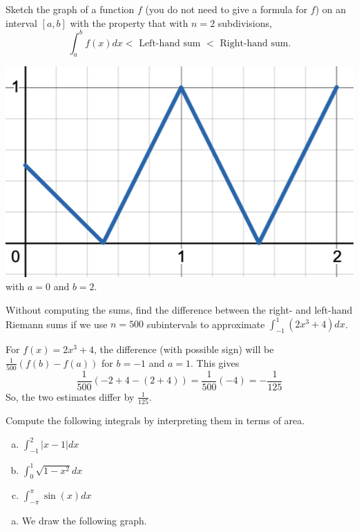 \documentclass[11pt]{exam}
\begin{document}
\begin{questions}
\begin{solution}
\begin{enumerate}[(a)]
  \end{enumerate}
\end{solution}
\question Sketch the graph of a function \(f\) (you do not need to
  give a formula for \(f\)) on an interval \([a,b]\) with the property
  that with \(n=2\) subdivisions, \[
    \int_a^b f(x) dx < \text{ Left-hand sum } < \text{ Right-hand sum.}
  \]
  \begin{solution}
    \includegraphics[scale=0.5]{Figures/s8.png} with \(a=0\) and \(b=2\).
  \end{solution}
\question Without computing the sums, find the difference between the
  right- and left-hand Riemann sums if we use \(n=500\) subintervals
  to approximate \(\int_{-1}^1 (2x^3+4) dx\).
  \begin{solution}
    For \(f(x) = 2x^3+4\), the difference (with possible sign) will be
    \(\frac{1}{500}(f(b)-f(a))\) for \(b = -1\) and \(a=1\). This
    gives \[
      \frac{1}{500}(-2+4-(2+4)) =
      \frac{1}{500}(-4) = -\frac{1}{125}
    \]
    So, the two estimates differ by \(\frac{1}{125}\).
  \end{solution}
\question Compute the following integrals by interpreting them in
  terms of area.
  \vspace{-0.25cm}
  \begin{multicols}{3}
    \begin{enumerate}[(a)]
    \item \(\int_{-1}^2 |x-1| dx\)
    \item \(\int_0^1 \sqrt{1-x^2} dx\)
    \item \(\int_{-\pi}^\pi \sin(x) dx\)
    \end{enumerate}
  \end{multicols}
  \begin{solution}
    \begin{enumerate}[(a)]
    \item We draw the following graph.


\end{enumerate}
\end{solution}
\end{questions}
\end{document}
